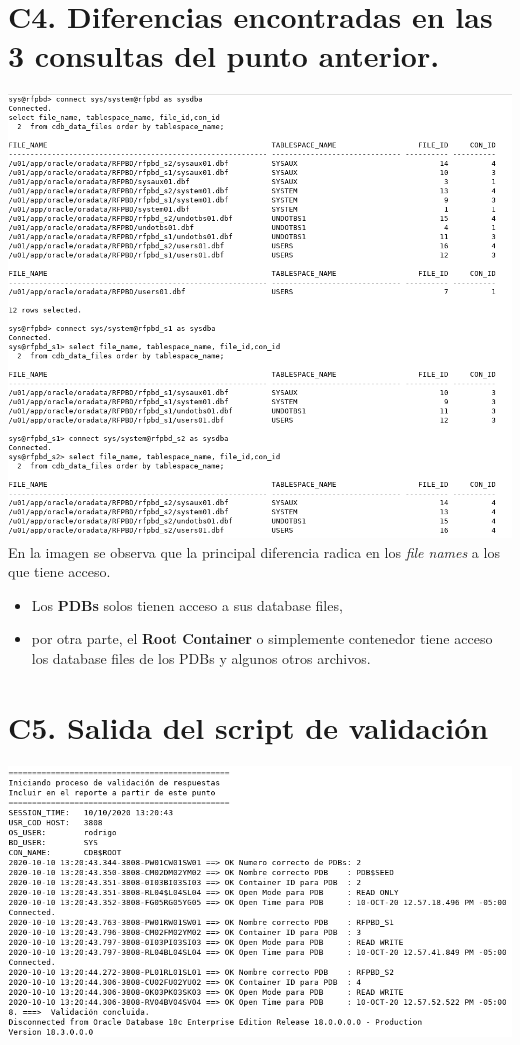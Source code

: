 \documentclass{article}
\begin{document}
\section*{C4. Diferencias encontradas en las 3
consultas del punto anterior.}

\includegraphics[width=\linewidth]{c4}\\

En la imagen se observa que la principal diferencia radica en los 
\textit{file names} a los que tiene acceso.
\begin{itemize}
    \item Los \textbf{PDBs} solos tienen acceso a sus database files,
    \item por otra parte, el \textbf{Root Container} o simplemente contenedor
    tiene acceso los database files de los PDBs y algunos otros archivos.
\end{itemize}

\section*{C5. Salida del script de validación}

\includegraphics[width=0.9\linewidth]{c5}
\end{document}
